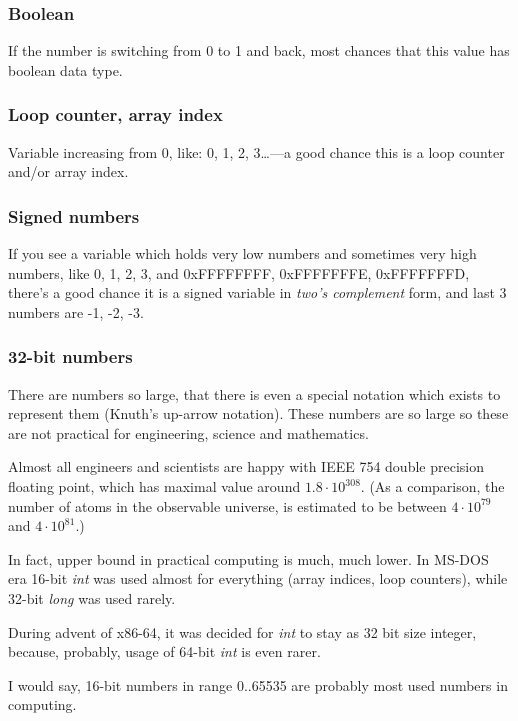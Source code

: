 \subsubsection{Boolean}

If the number is switching from 0 to 1 and back, most chances that this value has boolean data type.

\subsubsection{Loop counter, array index}

Variable increasing from 0, like: 0, 1, 2, 3\dots---a good chance this is a loop counter and/or array index.

\subsubsection{Signed numbers}

If you see a variable which holds very low numbers and sometimes very high numbers,
like 0, 1, 2, 3, and 0xFFFFFFFF, 0xFFFFFFFE, 0xFFFFFFFD,
there's a good chance it is a signed variable in \emph{two's complement} form,
and last 3 numbers are -1, -2, -3.

\subsubsection{32-bit numbers}
\label{MostPopularNumbers}

There are numbers so large,
that there is even a special notation which exists to represent them (Knuth's up-arrow notation).
These numbers are so large so these are not practical for engineering, science and mathematics.

Almost all engineers and scientists are happy with IEEE 754 double precision floating point, which has maximal
value around $1.8 \cdot 10^{308}$.
(As a comparison, the number of atoms in the observable universe, is estimated to be between
$4 \cdot 10^{79}$ and $4 \cdot 10^{81}$.)

In fact, upper bound in practical computing is much, much lower.
In MS-DOS era 16-bit \emph{int} was used almost for everything (array indices, loop counters),
while 32-bit \emph{long} was used rarely.

During advent of x86-64, it was decided for \emph{int} to stay as 32 bit size integer, because, probably,
usage of 64-bit \emph{int} is even rarer.

I would say, 16-bit numbers in range 0..65535 are probably most used numbers in computing.

